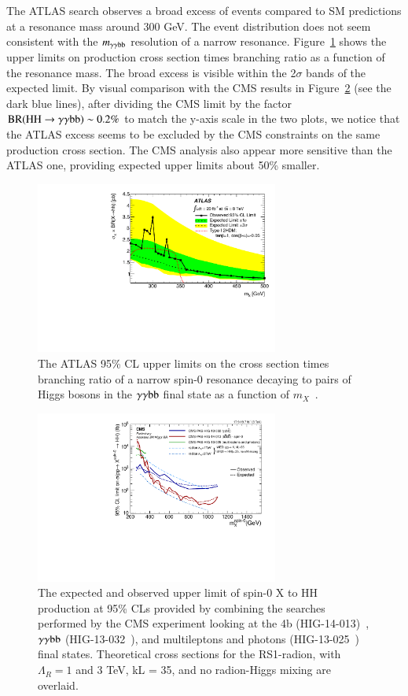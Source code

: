 \documentclass[3p,times,twocolumn]{elsarticle}
\begin{document}
The ATLAS search observes a broad excess of events compared to SM
predictions at a resonance mass around 300 GeV. The event distribution
does not seem consistent with the $m_{\gamma\gamma\rm{bb}}$ resolution
of a narrow resonance. Figure~\ref{fig:ATLAS_HH_ggbb} shows the upper limits on
production cross section times branching ratio as a function of the
resonance mass. The broad excess is visible within the 2$\sigma$ bands
of the expected limit. By visual comparison with the CMS results in
Figure~\ref{fig:CMS_HH_summary} (see the dark blue lines), after dividing the CMS limit by the factor
$\rm{BR(}\rm{HH}\rightarrow \gamma\gamma\rm{bb}\rm{)}\sim0.2\%$ to
match the y-axis scale in the two plots, we notice that the ATLAS excess seems to be excluded by
the CMS constraints on the same production cross section. The CMS
analysis also appear more sensitive than the ATLAS one, providing
expected upper limits about 50\% smaller.

\begin{figure}[htbp]
\centering
\includegraphics[width=8cm]{ATLAS_HH_ggbb_limit.pdf}
\caption{The ATLAS 95\% CL upper limits on the cross section times branching
  ratio of a narrow spin-0 resonance decaying to pairs of Higgs bosons
  in the $\gamma\gamma\rm{bb}$ final state as a function of $m_X$~\cite{Aad:2014yja}.}\label{fig:ATLAS_HH_ggbb}
\end{figure}

\begin{figure}[htbp]
\centering
\includegraphics[width=8cm]{CMS_HH_summary.pdf}
\caption{The expected and observed upper limit of spin-0 X to HH
  production at 95\% CLs provided by combining the searches performed
  by the CMS experiment looking at the 4b (HIG-14-013)~\cite{CMS:2014eda}, $\gamma\gamma\rm{bb}$
  (HIG-13-032~\cite{CMS:2014ipa}), and multileptons and photons
  (HIG-13-025~\cite{Khachatryan:2014jya}) final
  states. Theoretical cross sections for the RS1-radion, with
  $\Lambda_R = 1$ and 3 TeV, kL = 35, and no radion-Higgs mixing are overlaid.}\label{fig:CMS_HH_summary}
\end{figure}
\end{document}
